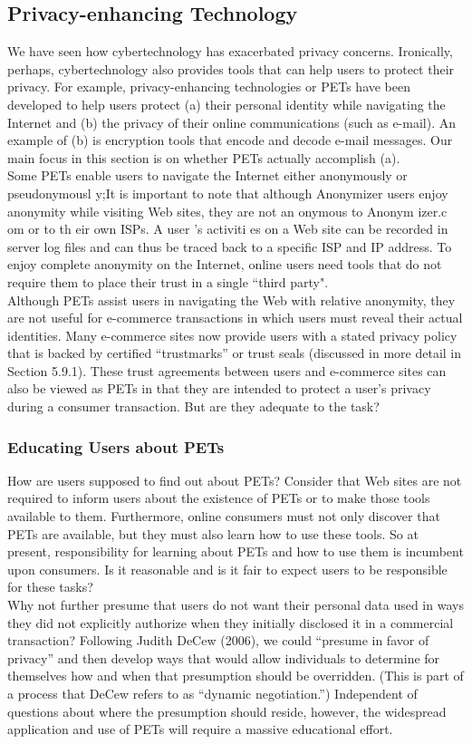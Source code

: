 \documentclass[12pt]{article}
\theoremstyle{definition}
\begin{document}
\subsection{Privacy-enhancing Technology}
We have seen how cybertechnology has exacerbated privacy concerns. Ironically,
perhaps, cybertechnology also provides tools that can help users to protect their privacy.
For example, privacy-enhancing technologies or PETs have been developed to help users
protect (a) their personal identity while navigating the Internet and (b) the privacy of
their online communications (such as e-mail). An example of (b) is encryption tools that
encode and decode e-mail messages. Our main focus in this section is on whether PETs
actually accomplish (a).\\
Some PETs enable users to navigate the Internet either anonymously or pseudonymousl
y;It is
important to note that although Anonymizer users enjoy anonymity while visiting Web
sites, they are not an onymous to Anonym izer.c om or to th eir own ISPs. A user ’s activiti es
on a Web site can be recorded in server log files and can thus be traced back to a specific
ISP and IP address. To enjoy complete anonymity on the Internet, online users need
tools that do not require them to place their trust in a single “third party".\\
Although PETs assist users in navigating the Web with relative anonymity, they are not useful for e-commerce transactions in which users must reveal their actual identities. Many e-commerce sites now provide users with a
stated privacy policy that is backed by certified “trustmarks” or trust seals (discussed in
more detail in Section 5.9.1). These trust agreements between users and e-commerce sites
can also be viewed as PETs in that they are intended to protect a user’s privacy during a
consumer transaction. But are they adequate to the task?
\subsubsection{Educating Users about PETs}
How are users supposed to find out about PETs? Consider that Web sites are not
required to inform users about the existence of PETs or to make those tools available to
them. Furthermore, online consumers must not only discover that PETs are available, but
they must also learn how to use these tools. So at present, responsibility for learning
about PETs and how to use them is incumbent upon consumers. Is it reasonable and is it
fair to expect users to be responsible for these tasks?\\
Why not further presume that users do not want their personal data used in ways
they did not explicitly authorize when they initially disclosed it in a commercial
transaction? Following Judith DeCew (2006), we could “presume in favor of privacy”
and then develop ways that would allow individuals to determine for themselves how
and when that presumption should be overridden. (This is part of a process that DeCew
refers to as “dynamic negotiation.”) Independent of questions about where the
presumption should reside, however, the widespread application and use of PETs
will require a massive educational effort.
\end{document}
